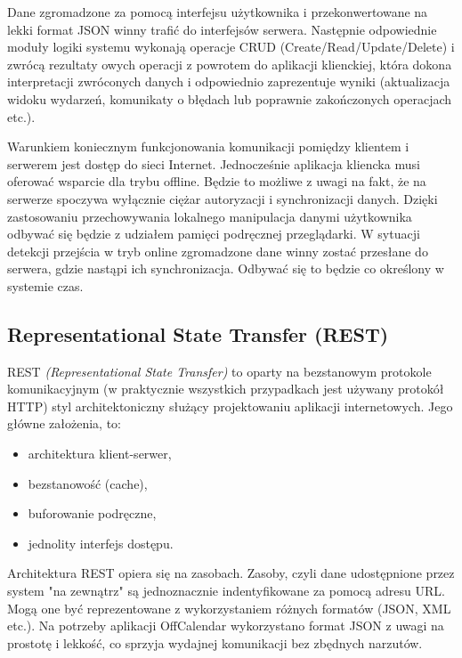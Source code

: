 Dane zgromadzone za pomocą interfejsu użytkownika i przekonwertowane na lekki format JSON winny trafić do interfejsów serwera. Następnie odpowiednie moduły logiki systemu wykonają operacje CRUD (Create/Read/Update/Delete) i zwrócą rezultaty owych operacji z powrotem do aplikacji klienckiej, która dokona interpretacji zwróconych danych i odpowiednio zaprezentuje wyniki (aktualizacja widoku wydarzeń, komunikaty o błędach lub poprawnie zakończonych operacjach etc.).

Warunkiem koniecznym funkcjonowania komunikacji pomiędzy klientem i serwerem jest dostęp do sieci Internet. Jednocześnie aplikacja kliencka musi oferować wsparcie dla trybu offline. Będzie to możliwe z uwagi na fakt, że na serwerze spoczywa wyłącznie ciężar autoryzacji i synchronizacji danych. Dzięki zastosowaniu przechowywania lokalnego manipulacja danymi użytkownika odbywać się będzie z udziałem pamięci podręcznej przeglądarki. W sytuacji detekcji przejścia w tryb online zgromadzone dane winny zostać przesłane do serwera, gdzie nastąpi ich synchronizacja. Odbywać się to będzie co określony w systemie czas.

\subsection{Representational State Transfer (REST)}
\label{sec:REST}

REST \emph{(Representational State Transfer)}\cite{restTut} to oparty na bezstanowym protokole komunikacyjnym (w praktycznie wszystkich przypadkach jest używany protokół HTTP) styl architektoniczny służący projektowaniu aplikacji internetowych. Jego główne założenia, to:

\begin{itemize}
\item architektura klient-serwer,
\item bezstanowość (cache),
\item buforowanie podręczne,
\item jednolity interfejs dostępu.
\end{itemize}

Architektura REST opiera się na zasobach. Zasoby, czyli dane udostępnione przez system "na zewnątrz" są jednoznacznie indentyfikowane za pomocą adresu URL. Mogą one być reprezentowane z wykorzystaniem różnych formatów (JSON, XML etc.). Na potrzeby aplikacji OffCalendar wykorzystano format JSON z uwagi na prostotę i lekkość, co sprzyja wydajnej komunikacji bez zbędnych narzutów.

